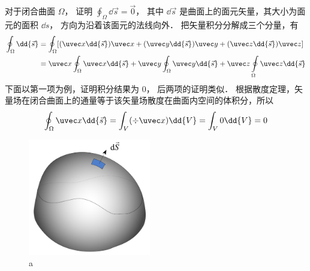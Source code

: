 

对于闭合曲面 $\Omega$，  证明 $\oint_\Omega  \dd{\vec s} = \vec 0$， 其中 $\dd{\vec s}$ 是曲面上的面元矢量，其大小为面元的面积 $\dd{s}$，  方向为沿着该面元的法线向外．
把矢量积分分解成三个分量，有
\begin{equation}
\begin{aligned}
\oint_\Omega  \dd{\vec s} & = \oint_\Omega  [(\uvec x \dd{\vec s})\uvec x + (\uvec y \dd{\vec s})\uvec y + (\uvec z \dd{\vec s})\uvec z] \\
&= \uvec x\oint_\Omega  \uvec x \dd{\vec s}  + \uvec y\oint_\Omega \uvec y \dd{\vec s} + \uvec z\oint\limits_\Omega \uvec z \dd{\vec s}
\end{aligned}
\end{equation}
下面以第一项为例，证明积分结果为 0， 后两项的证明类似．
根据散度定理，矢量场在闭合曲面上的通量等于该矢量场散度在曲面内空间的体积分，所以
\begin{equation}
\oint_\Omega  \uvec x \dd{\vec s}  = \int_V (\div \uvec x) \dd{V}  = \int_V 0 \dd{V}  = 0
\end{equation}
\begin{figure}[ht]
\centering
\includegraphics[width=5.34cm]{./figures/CSI01.pdf}
\caption{a} \label{CSI0_fig1}
\end{figure}

 
 

